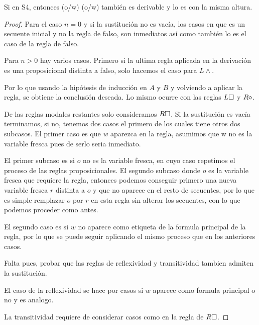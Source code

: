 \begin{teo}
  Si \Gamma \derives \Delta en S4, entonces \Gamma(o/w) \derives \Delta(o/w) también es derivable y lo es con la misma altura.
\end{teo}
\begin{proof}
  Para el caso $n=0$ y si la sustitución no es vacía, los casos en que es un secuente inicial y no la regla de falso, son inmediatos así como también lo es el caso de la regla de falso.
  
  Para $n>0$ hay varios casos.  Primero si la ultima regla aplicada en la derivación es una proposicional distinta a falso, solo hacemos el caso para $L \land$.
  

  Por lo que usando la hipótesis de inducción en $A$ y $B$ y volviendo a aplicar la regla, se obtiene la conclusión deseada. Lo mismo ocurre con las reglas $L\square$ y $R\diamond$. 

  De las reglas modales restantes solo consideramos $R\square$. Si la sustitución es vacía terminamos, si no, tenemos dos casos el primero de los cuales tiene otros dos subcasos. El primer caso es que $w$ aparezca en la regla, asumimos que w no es la variable fresca pues de serlo seria inmediato.

  El primer subcaso es si $o$ no es la variable fresca, en cuyo caso repetimos el proceso de las reglas proposicionales. El segundo subcaso donde $o$ es la variable fresca que requiere la regla, entonces podemos conseguir primero una nueva variable fresca $r$ distinta a $o$ y que no aparece en el resto de secuentes, por lo que es simple remplazar $o$ por $r$ en esta regla sin alterar los secuentes, con lo que podemos proceder como antes. 

  El segundo caso es si $w$ no aparece como etiqueta de la formula principal de la regla, por lo que se puede seguir aplicando el mismo proceso que en los anteriores casos.

  Falta pues, probar que las reglas de reflexividad y transitividad tambien admiten la sustitución. 

  El caso de la reflexividad se hace por casos si $w$ aparece como formula principal o no y es analogo.


  La transitividad requiere de considerar casos como en la regla de $R\square$.
\end{proof}
